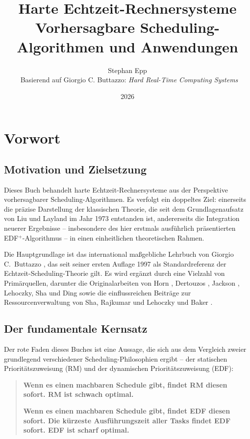 ﻿\documentclass[a4paper,12pt]{report}
\title{%
	\textbf{Harte Echtzeit-Rechnersysteme}\\[0.5em]
	\large Vorhersagbare Scheduling-Algorithmen und Anwendungen
}
\author{Stephan Epp\\
	\
	\small Basierend auf Giorgio C. Buttazzo: \textit{Hard Real-Time Computing Systems}}
\date{2026}
\theoremstyle{definition}
\begin{document}
\maketitle

\tableofcontents
\newpage

\chapter*{Vorwort}

\section*{Motivation und Zielsetzung}

Dieses Buch behandelt harte Echtzeit-Rechnersysteme aus der Perspektive
vorhersagbarer Scheduling-Algorithmen. Es verfolgt ein doppeltes Ziel:
einerseits die präzise Darstellung der klassischen Theorie, die seit dem
Grundlagenaufsatz von Liu und Layland \cite{Liu1973} im Jahr 1973 entstanden
ist, andererseits die Integration neuerer Ergebnisse -- insbesondere des
hier erstmals ausführlich präsentierten EDF$^+$-Algorithmus \cite{Epp2026} --
in einen einheitlichen theoretischen Rahmen.

Die Hauptgrundlage ist das international maßgebliche Lehrbuch von Giorgio C.\
Buttazzo \cite{Buttazzo2011}, das seit seiner ersten Auflage 1997 als
Standardreferenz der Echtzeit-Scheduling-Theorie gilt. Es wird ergänzt durch
eine Vielzahl von Primärquellen, darunter die Originalarbeiten von Horn
\cite{Horn1974}, Dertouzos \cite{Dertouzos1974}, Jackson \cite{Jackson1955},
Lehoczky, Sha und Ding \cite{Lehoczky1989} sowie die einflussreichen Beiträge
zur Ressourcenverwaltung von Sha, Rajkumar und Lehoczky \cite{Sha1990} und
Baker \cite{Baker1991}.

\section*{Der fundamentale Kernsatz}

Der rote Faden dieses Buches ist eine Aussage, die sich aus dem Vergleich
zweier grundlegend verschiedener Scheduling-Philosophien ergibt -- der
statischen Prioritätszuweisung (RM) und der dynamischen Prioritätszuweisung
(EDF):

\begin{quote}
\textbf{Wenn es einen machbaren Schedule gibt, findet RM diesen sofort.
RM ist schwach optimal.}

\textbf{Wenn es einen machbaren Schedule gibt, findet EDF diesen sofort.
Die kürzeste Ausführungszeit aller Tasks findet EDF sofort.
EDF ist scharf optimal.}
\end{quote}
\end{document}
